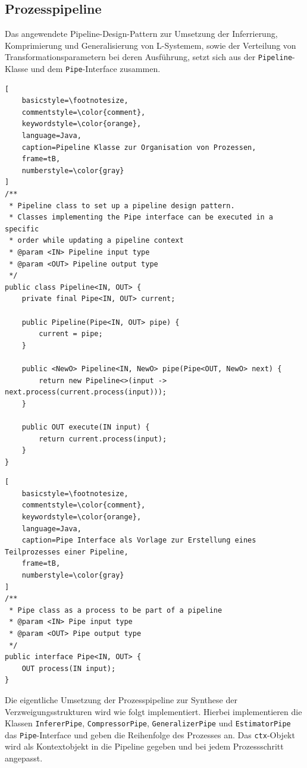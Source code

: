 \subsection*{Prozesspipeline}
Das angewendete Pipeline-Design-Pattern zur Umsetzung der Inferrierung, Komprimierung und Generalisierung von L-Systemem,
sowie der Verteilung von Transformationsparametern bei deren Ausführung, setzt sich aus der \texttt{Pipeline}-Klasse und
dem \texttt{Pipe}-Interface zusammen.

\newpage

\begin{lstlisting}[
    basicstyle=\footnotesize,
    commentstyle=\color{comment},
    keywordstyle=\color{orange},
    language=Java,
    caption=Pipeline Klasse zur Organisation von Prozessen,
    frame=tB,
    numberstyle=\color{gray}
]
/**
 * Pipeline class to set up a pipeline design pattern.
 * Classes implementing the Pipe interface can be executed in a specific
 * order while updating a pipeline context
 * @param <IN> Pipeline input type
 * @param <OUT> Pipeline output type
 */
public class Pipeline<IN, OUT> {
    private final Pipe<IN, OUT> current;

    public Pipeline(Pipe<IN, OUT> pipe) {
        current = pipe;
    }

    public <NewO> Pipeline<IN, NewO> pipe(Pipe<OUT, NewO> next) {
        return new Pipeline<>(input -> next.process(current.process(input)));
    }

    public OUT execute(IN input) {
        return current.process(input);
    }
}
\end{lstlisting}

\begin{lstlisting}[
    basicstyle=\footnotesize,
    commentstyle=\color{comment},
    keywordstyle=\color{orange},
    language=Java,
    caption=Pipe Interface als Vorlage zur Erstellung eines Teilprozesses einer Pipeline,
    frame=tB,
    numberstyle=\color{gray}
]
/**
 * Pipe class as a process to be part of a pipeline
 * @param <IN> Pipe input type
 * @param <OUT> Pipe output type
 */
public interface Pipe<IN, OUT> {
    OUT process(IN input);
}
\end{lstlisting}

Die eigentliche Umsetzung der Prozesspipeline zur Synthese der Verzweigungsstrukturen wird wie folgt implementiert.
Hierbei implementieren die Klassen \texttt{InfererPipe}, \texttt{CompressorPipe}, \texttt{GeneralizerPipe} und
\texttt{EstimatorPipe} das \texttt{Pipe}-Interface und geben die Reihenfolge des Prozesses an.
Das \texttt{ctx}-Objekt wird als Kontextobjekt in die Pipeline gegeben und bei jedem Prozessschritt angepasst.

